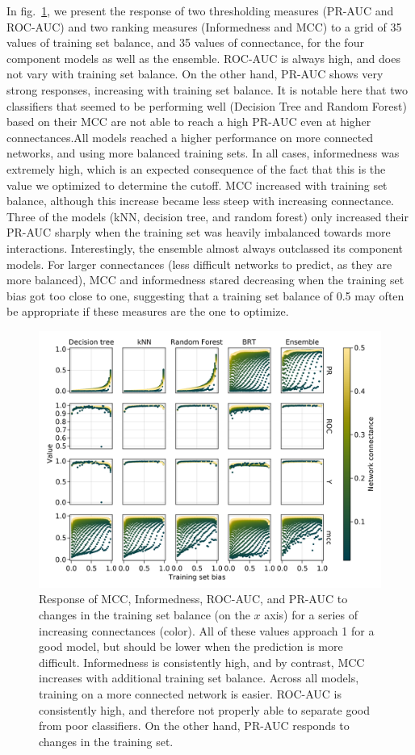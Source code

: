 \documentclass[11pt]{article}
\makeatletter
\def\maxwidth{\ifdim\Gin@nat@width>\linewidth\linewidth
\else\Gin@nat@width\fi}
\let\Oldincludegraphics\includegraphics
\renewcommand{\includegraphics}[1]{\Oldincludegraphics[width=\maxwidth]{#1}}
\makeatother
\begin{document}
In fig.~\ref{fig:biasco}, we present the response of two thresholding
measures (PR-AUC and ROC-AUC) and two ranking measures (Informedness and
MCC) to a grid of 35 values of training set balance, and 35 values of
connectance, for the four component models as well as the ensemble.
ROC-AUC is always high, and does not vary with training set balance. On
the other hand, PR-AUC shows very strong responses, increasing with
training set balance. It is notable here that two classifiers that
seemed to be performing well (Decision Tree and Random Forest) based on
their MCC are not able to reach a high PR-AUC even at higher
connectances.All models reached a higher performance on more connected
networks, and using more balanced training sets. In all cases,
informedness was extremely high, which is an expected consequence of the
fact that this is the value we optimized to determine the cutoff. MCC
increased with training set balance, although this increase became less
steep with increasing connectance. Three of the models (kNN, decision
tree, and random forest) only increased their PR-AUC sharply when the
training set was heavily imbalanced towards more interactions.
Interestingly, the ensemble almost always outclassed its component
models. For larger connectances (less difficult networks to predict, as
they are more balanced), MCC and informedness stared decreasing when the
training set bias got too close to one, suggesting that a training set
balance of 0.5 may often be appropriate if these measures are the one to
optimize.

\begin{figure}
\hypertarget{fig:biasco}{%
\centering
\includegraphics{figures/bias_by_connectance.png}
\caption{Response of MCC, Informedness, ROC-AUC, and PR-AUC to changes
in the training set balance (on the \(x\) axis) for a series of
increasing connectances (color). All of these values approach 1 for a
good model, but should be lower when the prediction is more difficult.
Informedness is consistently high, and by contrast, MCC increases with
additional training set balance. Across all models, training on a more
connected network is easier. ROC-AUC is consistently high, and therefore
not properly able to separate good from poor classifiers. On the other
hand, PR-AUC responds to changes in the training set.}\label{fig:biasco}
}
\end{figure}
\end{document}
